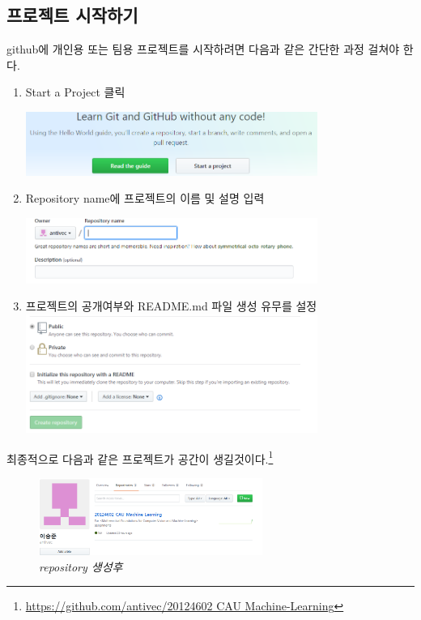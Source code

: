 \documentclass[12pt]{article}
\begin{document}
	\subsection{프로젝트 시작하기}
  	github에 개인용 또는 팀용 프로젝트를 시작하려면 다음과 같은 간단한 과정 걸쳐야 한다.
  	\begin{mdframed}[
  		linecolor= black,
  		roundcorner=10pt,
  		innertopmargin =\topskip,
  		leftmargin = 0.5cm,
  		rightmargin = 0.5cm,
  		frametitleaboveskip = 0.5pt,
  		frametitlerulewidth = 0.5pt,
  		frametitlealignment =,
  		frametitlebackgroundcolor = yellow,			
  		frametitle = {githhub 가입하기}	]
  		\begin{enumerate}
  			\item Start a Project 클릭
  			
  			\includegraphics[width=0.75\textwidth]{start}
  			\item Repository name에 프로젝트의 이름 및 설명 입력
  			
  			 \includegraphics[width=0.75\textwidth]{owner}
  			\item 프로젝트의 공개여부와 README.md 파일 생성 유무를 설정  			
  			\includegraphics[width=0.75\textwidth]{publc}
  		\end{enumerate}  		
  	\end{mdframed} 
  최종적으로 다음과 같은 프로젝트가 공간이 생길것이다.\footnote{\href{https://github.com/antivec/20124602_CAU_Machine-Learning}{https://github.com/antivec/20124602 CAU Machine-Learning}}  
  \begin{figure}[!hbp] 
  	\label{create_repository}
  	\includegraphics[width=0.65\textwidth]{create_repository}
  	\caption{\textsl{repository 생성후}}
  \end{figure}
\end{document}
